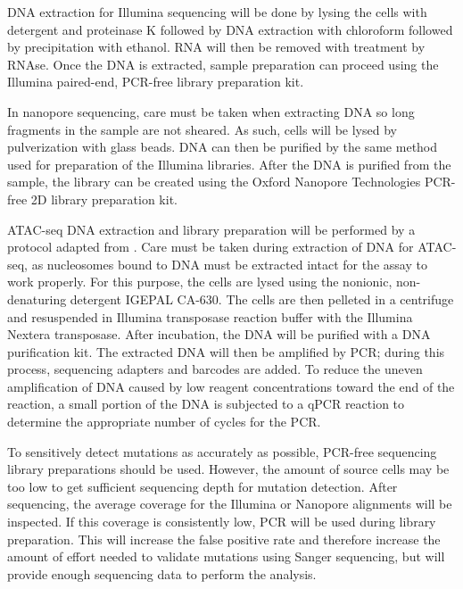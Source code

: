 DNA extraction for Illumina sequencing will be done by lysing the cells with detergent and proteinase K followed by DNA extraction with chloroform followed by precipitation with ethanol. RNA will then be removed with treatment by RNAse. Once the DNA is extracted, sample preparation can proceed using the Illumina paired-end, PCR-free library preparation kit.

In nanopore sequencing, care must be taken when extracting DNA so long fragments in the sample are not sheared. As such, cells will be lysed by pulverization with glass beads. DNA can then be purified by the same method used for preparation of the Illumina libraries. After the DNA is purified from the sample, the library can be created using the Oxford Nanopore Technologies PCR-free 2D library preparation kit. 

ATAC-seq DNA extraction and library preparation will be performed by a protocol adapted from \cite{buenrostro_atac-seq:_2015}.
Care must be taken during extraction of DNA for ATAC-seq, as nucleosomes bound to DNA must be extracted intact for the assay to work properly. For this purpose, the cells are lysed using the nonionic, non-denaturing detergent IGEPAL CA-630. The cells are then pelleted in a centrifuge and resuspended in Illumina transposase reaction buffer with the Illumina Nextera transposase. After incubation, the DNA will be purified with a DNA purification kit. The extracted DNA will then be amplified by PCR; during this process, sequencing adapters and barcodes are added. To reduce the uneven amplification of DNA caused by low reagent concentrations toward the end of the reaction, a small portion of the DNA is subjected to a qPCR reaction to determine the appropriate number of cycles for the PCR.

To sensitively detect mutations as accurately as possible, PCR-free sequencing library preparations should be used. However, the amount of source cells may be too low to get sufficient sequencing depth for mutation detection. After sequencing, the average coverage for the Illumina or Nanopore alignments will be inspected. If this coverage is consistently low, PCR will be used during library preparation. This will increase the false positive rate and therefore increase the amount of effort needed to validate mutations using Sanger sequencing, but will provide enough sequencing data to perform the analysis.


